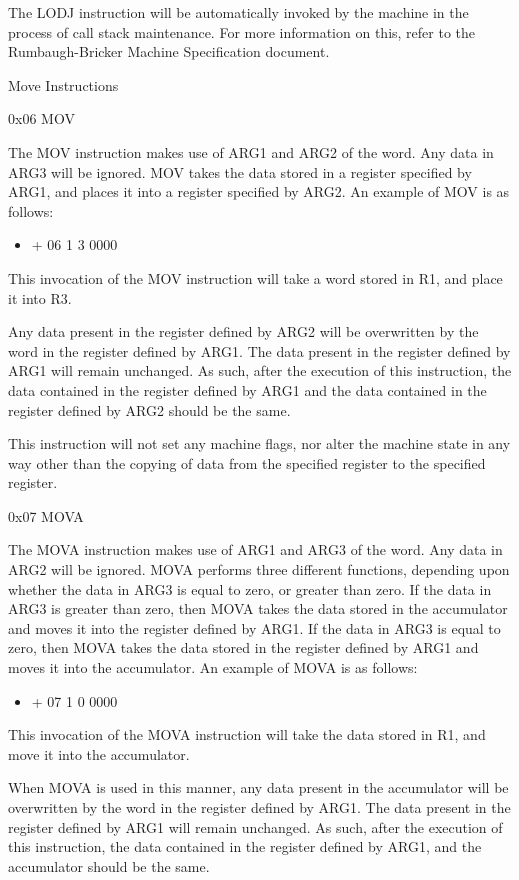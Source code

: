 \documentclass[]{article}
\providecommand{\tightlist}{%
  \setlength{\itemsep}{0pt}\setlength{\parskip}{0pt}}
\begin{document}
The LODJ instruction will be automatically invoked by the machine in the
process of call stack maintenance. For more information on this, refer
to the Rumbaugh-Bricker Machine Specification document.

Move Instructions

0x06 MOV

The MOV instruction makes use of ARG1 and ARG2 of the word. Any data in
ARG3 will be ignored. MOV takes the data stored in a register specified
by ARG1, and places it into a register specified by ARG2. An example of
MOV is as follows:

\begin{itemize}
\tightlist
\item
  + 06 1 3 0000
\end{itemize}

This invocation of the MOV instruction will take a word stored in R1,
and place it into R3.

Any data present in the register defined by ARG2 will be overwritten by
the word in the register defined by ARG1. The data present in the
register defined by ARG1 will remain unchanged. As such, after the
execution of this instruction, the data contained in the register
defined by ARG1 and the data contained in the register defined by ARG2
should be the same.

This instruction will not set any machine flags, nor alter the machine
state in any way other than the copying of data from the specified
register to the specified register.

0x07 MOVA

The MOVA instruction makes use of ARG1 and ARG3 of the word. Any data in
ARG2 will be ignored. MOVA performs three different functions, depending
upon whether the data in ARG3 is equal to zero, or greater than zero. If
the data in ARG3 is greater than zero, then MOVA takes the data stored
in the accumulator and moves it into the register defined by ARG1. If
the data in ARG3 is equal to zero, then MOVA takes the data stored in
the register defined by ARG1 and moves it into the accumulator. An
example of MOVA is as follows:

\begin{itemize}
\tightlist
\item
  + 07 1 0 0000
\end{itemize}

This invocation of the MOVA instruction will take the data stored in R1,
and move it into the accumulator.

When MOVA is used in this manner, any data present in the accumulator
will be overwritten by the word in the register defined by ARG1. The
data present in the register defined by ARG1 will remain unchanged. As
such, after the execution of this instruction, the data contained in the
register defined by ARG1, and the accumulator should be the same.
\end{document}
